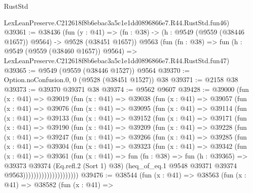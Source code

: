 \begin{lexlean}{RustStd}
\begin{coremodule}
    LexLeanPreserve.C212618f8b6ebac3a5c1e1dd0896866e7.R44.RustStd.fun46)
@39361 := @38436
    (fun (y : @41) =>
    (fn : @38) -> (h : @9549 (@9559 (@38446 @1657)) @9564) -> @9528 (@38451 @1657))
    @9563
    (fun (fn : @38) =>
    fun (h : @9549 (@9559 (@38460 @1657)) @9564) =>
    LexLeanPreserve.C212618f8b6ebac3a5c1e1dd0896866e7.R44.RustStd.fun47)
@39365 := @9549 (@9559 (@38446 @1527)) @9564
@39370 := Option.noConfusion.{0, 0} (@9528 (@38451 @1527)) @38
@39371 := @2158 @38
@39373 := @39370 @39371 @38
@39374 := @9562 @9607
@39428 := @39000
    (fun (x : @41) =>
    @39019
      (fun (x : @41) =>
      @39038
        (fun (x : @41) =>
        @39057
          (fun (x : @41) =>
          @39076
            (fun (x : @41) =>
            @39095
              (fun (x : @41) =>
              @39114
                (fun (x : @41) =>
                @39133
                  (fun (x : @41) =>
                  @39152
                    (fun (x : @41) =>
                    @39171
                      (fun (x : @41) =>
                      @39190
                        (fun (x : @41) =>
                        @39209
                          (fun (x : @41) =>
                          @39228
                            (fun (x : @41) =>
                            @39247
                              (fun (x : @41) =>
                              @39266
                                (fun (x : @41) =>
                                @39285
                                  (fun (x : @41) =>
                                  @39304
                                    (fun (x : @41) =>
                                    @39323
                                      (fun (x : @41) =>
                                      @39342
                                        (fun (x : @41) =>
                                        @39361
                                          (fun (x : @41) =>
                                          fun (fn : @38) =>
                                          fun (h : @39365) =>
                                          @39373
                                            @39374
                                            (Eq.refl.{2} (Sort 1) @38)
                                            (heq_of_eq.{1}
                                              @9548
                                              @39371
                                              @39374
                                              @9563)))))))))))))))))))))
@39476 := @38544
    (fun (x : @41) =>
    @38563
      (fun (x : @41) =>
      @38582
        (fun (x : @41) =>

\end{coremodule}
\end{lexlean}
